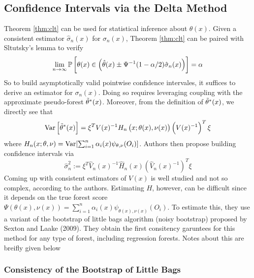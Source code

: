 \subsection{Confidence Intervals via the Delta Method}
Theorem \ref{thm:clt} can be used for statistical inference about $\theta(x)$. Given a consistent estimator $\hat{\sigma}_n(x)$ for $\sigma_n(x)$, Theorem \ref{thm:clt} can be paired with Sltutsky's lemma to verify
\[\lim_{n\rightarrow\infty} \mathbb{P}\left[\theta(x) \in \left(\hat{\theta}(x) \pm \Psi^{-1}(1-\alpha/2)\hat{\sigma}_n(x)\right)\right] = \alpha\]
So to build asymptotically valid pointwise confidence intervales, it suffices to derive an estimator for $\sigma_n(x)$. Doing so requires leveraging coupling with the approximate pseudo-forest $\tilde{\theta}^*(x)$. Moreover, from the definition of $\tilde{\theta}^*(x)$, we directly see that 
\begin{equation}
	\label{eq:varThetaT*}
	\operatorname{Var}\left[\tilde{\theta}^*(x)\right] = \xi^T V(x)^{-1} H_n\left(x; \theta(x), \nu(x)\right)\left(V(x)^{-1}\right)^T \xi
\end{equation}
where $H_n(x;\theta, \nu) = \operatorname{Var}[\sum_{i=1}^n \alpha_i(x) \psi_{\theta,\nu}(O_i)]$. Authors then propose building confidence intervals via
\begin{equation}
	\label{eq:sigmaHat}
	\hat{\sigma}_n^2 := \xi^T \hat{V}_n(x)^{-1} \hat{H}_n(x) (\hat{V}_n(x)^{-1})^T \xi
\end{equation}
Coming up with consistent estimators of $V(x)$ is well studied and not so complex, according to the authors. Estimating $H$, however, can be difficult since it depends on the true forest score $\Psi(\theta(x), \nu(x)) = \sum_{i=1}^n \alpha_i(x) \psi_{\theta(x), \nu(x)}(O_i)$. To estimate this, they use a variant of the bootstrap of little bags algorithm (noisy bootstrap) proposed by Sexton and Laake (2009). They obtain the first consitency garuntees for this method for any type of forest, including regression forests. Notes about this are breifly given below

\subsubsection{Consistency of the Bootstrap of Little Bags}


